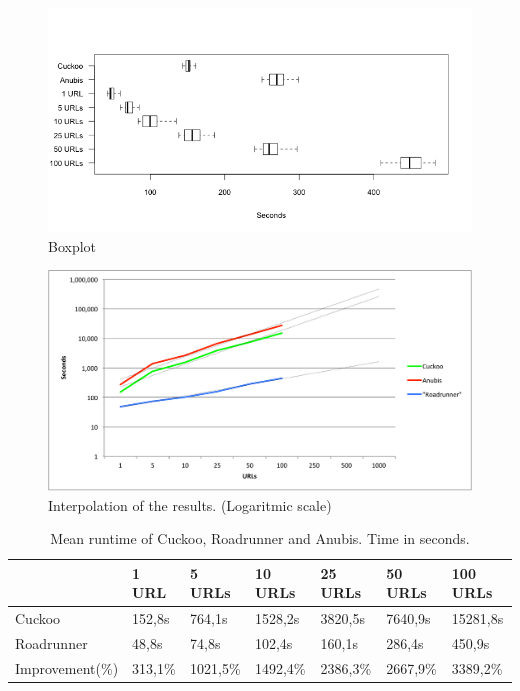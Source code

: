 \begin{figure}[h]
    \centering
    \centerline{\includegraphics[width=17cm]{Images/chart-box.png}}
    \caption{Boxplot}
    \label{fig:chart-box}
\end{figure}

\begin{figure}[h]
    \centering
    \centerline{\includegraphics[width=17cm]{Images/chart-trend}}
    \caption{Interpolation of the results. (Logaritmic scale)}
    \label{fig:chart-trend}
\end{figure}

\begin{table}[h]
\begin{tabular}{@{}lllllll@{}}
\toprule
                                  & 1 URL    & 5 URLs   & 10 URLs      & 25 URLs      & 50 URLs     & 100 URLs \\ \midrule
Cuckoo       & 152,8s   & 764,1s   & 1528,2s      & 3820,5s      & 7640,9s     & 15281,8s \\
Roadrunner& 48,8s    & 74,8s    & 102,4s       & 160,1s       & 286,4s      & 450,9s   \\
Improvement(\%)                   & 313,1\%  & 1021,5\% & 1492,4\%     & 2386,3\%     & 2667,9\%    & 3389,2\% \\ \bottomrule
\end{tabular}
\caption{Mean runtime of Cuckoo, Roadrunner and Anubis. Time in seconds.}
\label{tbl:results}
\end{table}
